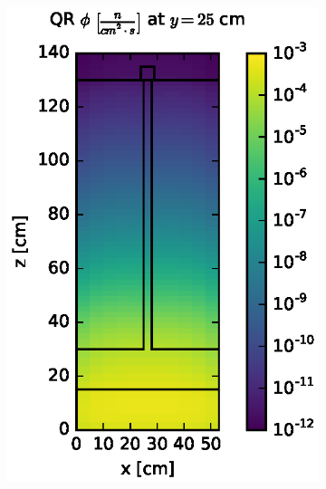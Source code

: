 \documentclass{article} %
\begin{document}
\begin{figure}[!htb]
\centering
\begin{subfigure}{0.4\textwidth}
\includegraphics[max height=0.445\textheight]
{steel-fwd-flux-qr04.eps}
\end{subfigure} ~
\begin{subfigure}{0.4\textwidth}

\end{subfigure}
\end{figure}
\end{document}
